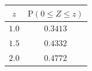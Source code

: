 {\setlength{\tabcolsep}{5pt}\renewcommand{\arraystretch}{1.25}%
\begin{tabular}{|c|c|}
\hline
$z$ & $\mathrm{P}(0\le Z\le z)$ \\
\hline
$1.0$ & $0.3413$ \\
\hline
$1.5$ & $0.4332$ \\
\hline
$2.0$ & $0.4772$ \\
\hline
\end{tabular}}
